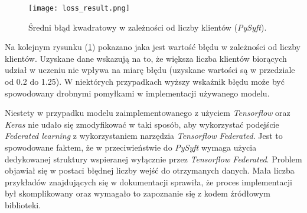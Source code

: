 \begin{figure}[h]
    \texttt{[image: loss\_result.png]}
    \caption{Średni błąd kwadratowy w zależności od liczby klientów (\textit{PySyft}).}
    \label{fig:loss_result}
\end{figure}

Na kolejnym rysunku (\ref{fig:loss_result}) pokazano jaka jest wartość błędu w zależności od liczby klientów. Uzyskane dane wskazują na to, że większa liczba klientów biorących udział w uczeniu nie wpływa na miarę błędu (uzyskane wartości są w przedziale od 0.2 do 1.25). W niektórych przypadkach wyższy wskaźnik błędu może być spowodowany drobnymi pomyłkami w implementacji używanego modelu.

Niestety w przypadku modelu zaimplementowanego z użyciem \textit{Tensorflow} oraz \textit{Keras} nie udało się zmodyfikować w taki sposób, aby wykorzystać podejście \textit{Federated learning} z wykorzystaniem narzędzia \textit{Tensorflow Federated}. Jest to spowodowane faktem, że w przeciwieństwie do \textit{PySyft} wymaga użycia dedykowanej struktury wspieranej wyłącznie przez \textit{Tensorflow Federated}. Problem objawiał się w postaci błędnej liczby wejść do otrzymanych danych. Mała liczba przykładów znajdujących się w dokumentacji sprawiła, że proces implementacji był skomplikowany oraz wymagało to zapoznanie się z kodem źródłowym biblioteki.

